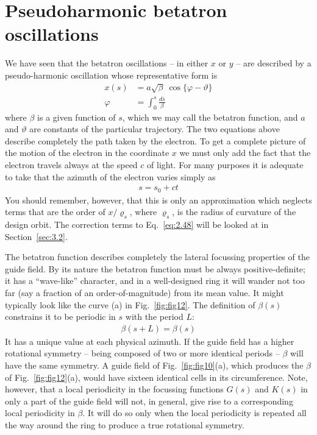 \section{Pseudoharmonic betatron oscillations}\label{sec:2.6}
We have seen that the betatron oscillations -- in either $x$ or $y$ -- are described by a pseudo-harmonic oscillation whose representative form is
\begin{align}
	x(s) &= a\sqrt{\beta}\ \cos\{\varphi-\vartheta\}\label{eq:2.46}\\
	\varphi &= \int_{0}^{s} \frac{d\bar{s}}{\beta}\label{eq:2.47}
\end{align}
where $\beta$ is a given function of $s$, which we may call the betatron function, and $a$
and $\vartheta$ are constants of the particular trajectory. The two equations above describe completely the path taken by the electron. To get a complete picture of the motion of the electron in the coordinate $x$ we must only add the fact that the electron travels always at the speed $c$ of light. For many purposes it is adequate to take that the azimuth of the electron varies simply as
\begin{align}
	s = s_0 + ct\label{eq:2.48}
\end{align}
You should remember, however, that this is only an approximation which neglects terms that are the order of $x/\varrho_s$, where $\varrho_s$, is the radius of curvature of the design orbit. The correction terms to Eq.~\eqref{eq:2.48} will be looked at in Section~\ref{sec:3.2}.

The betatron function describes completely the lateral focussing properties of the guide field. By its nature the betatron function must be always positive-definite; it has a “wave-like” character, and in a well-designed ring it will wander not too far (say a fraction of an order-of-magnitude) from its mean value. It might typically look like the curve (a) in Fig.~\ref{fig:fig12}. The definition of $\beta(s)$ constrains it to be periodic in $s$ with the period $L$:
\begin{align}
	\beta(s+L) = \beta(s)
\end{align}
It has a unique value at each physical azimuth. If the guide field has a higher rotational symmetry -- being composed of two or more identical periods -- $\beta$ will have the same symmetry. A guide field of Fig.~\ref{fig:fig10}(a), which produces the $\beta$ of Fig.~\ref{fig:fig12}(a),  would have sixteen identical cells in its circumference. Note, however, that a local periodicity in the focussing functions $G(s)$ and $K(s)$ in only a part of the guide field will not, in general, give rise to a corresponding local periodicity in $\beta$. It will do so only when the local periodicity is repeated all the way around the ring to produce a true rotational symmetry.

